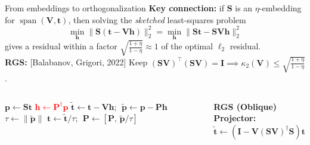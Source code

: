\documentclass[xcolor=dvipsnames,10pt]{beamer}
\renewcommand{\vec}[1]{\bm{#1}}
\newcommand{\mat}[1]{\bm{#1}}
\newcommand{\rr}[1]{\textcolor{red}{#1}}
\begin{document}
\begin{frame}{From embeddings to orthogonalization}
\textbf{Key connection:} if $\mat{S}$ is an $\eta$-embedding for
$\operatorname{span}(\mat{V}, \vec{t})$, then solving the \emph{sketched}
least-squares problem
\[
  \min_{\vec{h}}\|\mat{S}(\vec{t} - \mat{V}\vec{h})\|_2^2 = \min_{\vec{h}}\|\mat{S}\vec{t} - \mat{S}\mat{V}\vec{h}\|_2^2
\]
gives a residual within a factor $\sqrt{\frac{1+\eta}{1-\eta}} \approx 1$ of
the optimal $\ell_2$ residual. \\
\pause
\vspace{1em}
\textbf{RGS:} {\footnotesize [Balabanov, Grigori, 2022]} Keep $(\mat{SV})^\top (\mat{SV}) = \mat{I} \implies \kappa_2(\mat{V}) \leq \sqrt{\frac{1+\eta}{1-\eta}}$.
\begin{tcolorbox}[colback=orange!5,colframe=orange!60!black,
  boxrule=0.4pt,top=2pt,bottom=2pt,left=3pt,right=3pt]
\begin{columns}[T]
  \begin{algorithmic}[1]
    \State $\vec{p} \gets \mat{S}\vec{t}$
    \State \rr{$\vec{h} \gets \mat{P}^\dagger \vec{p}$}
          \Comment{exact: $\mat{P}^\dagger = \mat{P}^\top$}
    \State $\tilde{\vec{t}} \gets \vec{t} {-} \mat{V}\vec{h}$;
           $\;\tilde{\vec{p}} \gets \vec{p} {-} \mat{P}\vec{h}$
    \State $\tau \gets \|\tilde{\vec{p}}\|$
    \State $\vec{t} \gets \tilde{\vec{t}}/\tau$;
           $\;\mat{P} \leftarrow [\mat{P},\, \tilde{\vec{p}}/\tau]$
  \end{algorithmic}
  \footnotesize\vspace{1em}
  \textbf{RGS (Oblique) Projector:}
  \begin{equation*}
      \vec{\tilde{t}} \gets (\mat{I}-\mat{V}(\mat{SV})^\dagger\mat{S})\vec{t}
  \end{equation*}
\end{columns}
\end{tcolorbox}
\end{frame}

\end{document}
